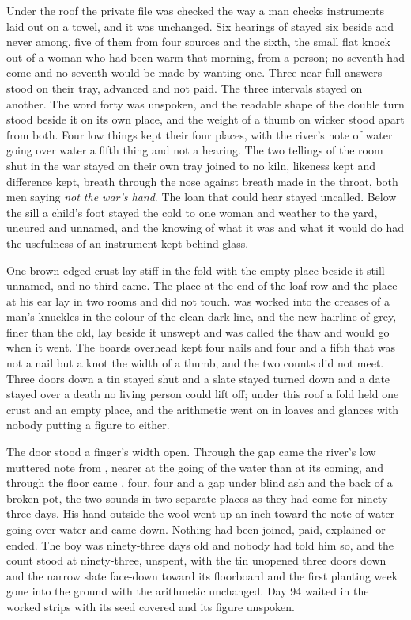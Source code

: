 Under the roof the private file was checked the way a man checks instruments laid out on a towel, and it was unchanged. Six hearings of  stayed six beside and never among, five of them from four sources and the sixth, the small flat knock out of a woman who had been warm that morning, from a person; no seventh had come and no seventh would be made by wanting one. Three near-full answers stood on their tray, advanced and not paid. The three intervals stayed on another. The word forty was unspoken, and the readable shape of the double turn stood beside it on its own place, and the weight of a thumb on wicker stood apart from both. Four low things kept their four places, with the river's note of water going over water a fifth thing and not a hearing. The two tellings of the room shut in the war stayed on their own tray joined to no kiln, likeness kept and difference kept, breath through the nose against breath made in the throat, both men saying \emph{not the war's hand}. The loan that could hear stayed uncalled. Below the sill a child's foot stayed the cold to one woman and weather to the yard, uncured and unnamed, and the knowing of what it was and what it would do had the usefulness of an instrument kept behind glass.

One brown-edged crust lay stiff in the fold with the empty place beside it still unnamed, and no third came. The place at the end of the loaf row and the place at his ear lay in two rooms and did not touch.  was worked into the creases of a man's knuckles in the colour of the clean dark line, and the new hairline of grey, finer than the old, lay beside it unswept and was called the thaw and would go when it went. The boards overhead kept four nails and four and a fifth that was not a nail but a knot the width of a thumb, and the two counts did not meet. Three doors down a tin stayed shut and a slate stayed turned down and a date stayed over a death no living person could lift off; under this roof a fold held one crust and an empty place, and the arithmetic went on in loaves and glances with nobody putting a figure to either.

The door stood a finger's width open. Through the gap came the river's low muttered note from , nearer at the going of the water than at its coming, and through the floor came , four, four and a gap under blind ash and the back of a broken pot, the two sounds in two separate places as they had come for ninety-three days. His hand outside the wool went up an inch toward the note of water going over water and came down. Nothing had been joined, paid, explained or ended. The boy was ninety-three days old and nobody had told him so, and the count stood at ninety-three, unspent, with the tin unopened three doors down and the narrow slate face-down toward its floorboard and the first planting week gone into the ground with the arithmetic unchanged. Day 94 waited in the worked strips with its seed covered and its figure unspoken.
